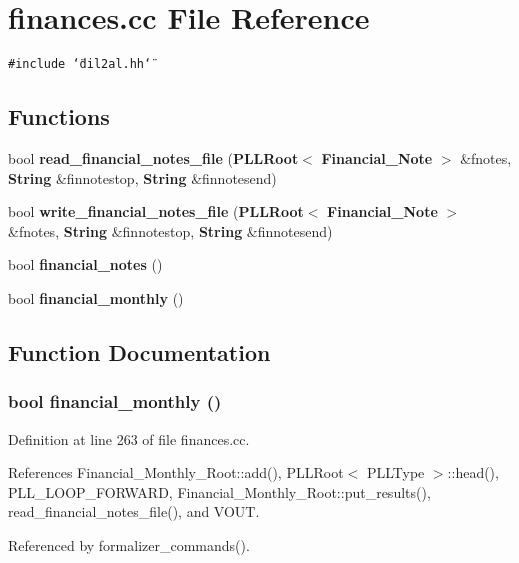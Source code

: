 \section{finances.cc File Reference}
\label{finances_8cc}
{\tt \#include \char`\"{}dil2al.hh\char`\"{}}\par
\subsection*{Functions}
\begin{CompactItemize}
\item 
bool {\bf read\_\-financial\_\-notes\_\-file} ({\bf PLLRoot}$<$ {\bf Financial\_\-Note} $>$ \&fnotes, {\bf String} \&finnotestop, {\bf String} \&finnotesend)
\item 
bool {\bf write\_\-financial\_\-notes\_\-file} ({\bf PLLRoot}$<$ {\bf Financial\_\-Note} $>$ \&fnotes, {\bf String} \&finnotestop, {\bf String} \&finnotesend)
\item 
bool {\bf financial\_\-notes} ()
\item 
bool {\bf financial\_\-monthly} ()
\end{CompactItemize}


\subsection{Function Documentation}
\subsubsection{\setlength{\rightskip}{0pt plus 5cm}bool financial\_\-monthly ()}\label{finances_8cc_a3}




Definition at line 263 of file finances.cc.

References Financial\_\-Monthly\_\-Root::add(), PLLRoot$<$ PLLType $>$::head(), PLL\_\-LOOP\_\-FORWARD, Financial\_\-Monthly\_\-Root::put\_\-results(), read\_\-financial\_\-notes\_\-file(), and VOUT.

Referenced by formalizer\_\-commands().



